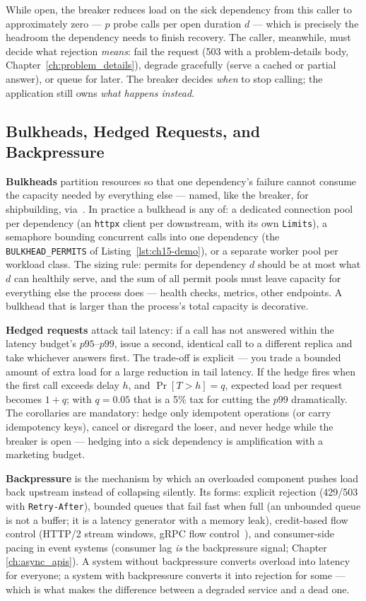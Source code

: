 While open, the breaker reduces load on the sick dependency from this
caller to approximately zero --- $p$ probe calls per open duration $d$ ---
which is precisely the headroom the dependency needs to finish recovery.
The caller, meanwhile, must decide what rejection \emph{means}: fail the
request (503 with a problem-details body, Chapter~\ref{ch:problem_details}),
degrade gracefully (serve a cached or partial answer), or queue for later.
The breaker decides \emph{when} to stop calling; the application still owns
\emph{what happens instead}.

\subsection{Bulkheads, Hedged Requests, and Backpressure}
\label{subsec:ch15-bulkheads}

\textbf{Bulkheads} partition resources so that one dependency's failure
cannot consume the capacity needed by everything else --- named, like the
breaker, for shipbuilding, via~\cite{nygard2018releaseit}. In practice a
bulkhead is any of: a dedicated connection pool per dependency (an
\texttt{httpx} client per downstream, with its own \texttt{Limits}), a
semaphore bounding concurrent calls into one dependency (the
\texttt{BULKHEAD\_PERMITS} of Listing~\ref{lst:ch15-demo}), or a separate
worker pool per workload class. The sizing rule: permits for dependency $d$
should be at most what $d$ can healthily serve, and the sum of all permit
pools must leave capacity for everything else the process does --- health
checks, metrics, other endpoints. A bulkhead that is larger than the
process's total capacity is decorative.

\textbf{Hedged requests} attack tail latency: if a call has not answered
within the latency budget's $p95$--$p99$, issue a second, identical call to
a different replica and take whichever answers first. The trade-off is
explicit --- you trade a bounded amount of extra load for a large reduction
in tail latency. If the hedge fires when the first call exceeds delay $h$,
and $\Pr[T > h] = q$, expected load per request becomes $1 + q$; with
$q = 0.05$ that is a 5\% tax for cutting the $p99$ dramatically. The
corollaries are mandatory: hedge only idempotent operations (or carry
idempotency keys), cancel or disregard the loser, and never hedge while the
breaker is open --- hedging into a sick dependency is amplification with a
marketing budget.

\textbf{Backpressure} is the mechanism by which an overloaded component
pushes load back upstream instead of collapsing silently. Its forms:
explicit rejection (429/503 with \texttt{Retry-After}), bounded queues that
fail fast when full (an unbounded queue is not a buffer; it is a latency
generator with a memory leak), credit-based flow control (HTTP/2 stream
windows, gRPC flow control~\cite{grpcdocs}), and consumer-side pacing in
event systems (consumer lag \emph{is} the backpressure signal; Chapter
\ref{ch:async_apis}). A system without backpressure converts overload into
latency for everyone; a system with backpressure converts it into rejection
for some --- which is what makes the difference between a degraded service
and a dead one.

